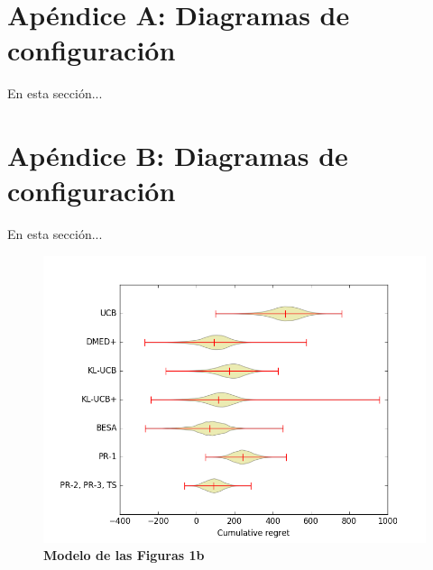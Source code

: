 \chapter{Apéndice A: Diagramas de configuración}
En esta sección...


\chapter{Apéndice B: Diagramas de configuración}
En esta sección...
\begin{figure}[!htbp]
    \centering
    \includegraphics[width=0.85\linewidth]{recursos/Figure1b.png}
    \caption{\textbf{Modelo de las Figuras 1b \cite{upm56279}}}
    \label{fig:figura1aes}
\end{figure}